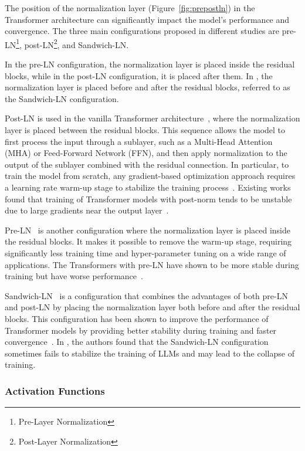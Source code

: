 The position of the normalization layer (Figure~\ref{fig:prepostln}) in the Transformer architecture can significantly impact the model's performance and convergence.
The three main configurations proposed in different studies are pre-LN\footnote{Pre-Layer Normalization}, post-LN\footnote{Post-Layer Normalization}, and Sandwich-LN\@.

In the pre-LN configuration, the normalization layer is placed inside the residual blocks, while in the post-LN configuration, it is placed after them.
In \textcite{ding2021cogview}, the normalization layer is placed before and after the residual blocks, referred to as the Sandwich-LN configuration.

Post-LN is used in the vanilla Transformer architecture~\cite{vaswani2023attention}, where the normalization layer is placed between the residual blocks.
This sequence allows the model to first process the input through a sublayer, such as a Multi-Head Attention (MHA) or Feed-Forward Network (FFN), and then apply normalization to the output of the sublayer combined with the residual connection.
In particular, to train the model from scratch, any gradient-based optimization approach requires a learning rate warm-up stage to stabilize the training process~\cite{vaswani2023attention}.
Existing works found that training of Transformer models with post-norm tends to be unstable due to large gradients near the output layer~\cite{xiong2020layer}.

Pre-LN~\cite{baevski2019adaptive} is another configuration where the normalization layer is placed inside the residual blocks.
It makes it possible to remove the warm-up stage, requiring significantly less training time and hyper-parameter tuning on a wide range of applications.
The Transformers with pre-LN have shown to be more stable during training but have worse performance~\cite{liu2020understanding}.

Sandwich-LN~\cite{ding2021cogview} is a configuration that combines the advantages of both pre-LN and post-LN by placing the normalization layer both before and after the residual blocks.
This configuration has been shown to improve the performance of Transformer models by providing better stability during training and faster convergence~\cite{ding2021cogview}.
In \textcite{zeng2022glm130b}, the authors found that the Sandwich-LN configuration sometimes fails to stabilize the training of LLMs and may lead to the collapse of training.

\subsubsection{Activation Functions}
\label{subsubsec:activation-functions}

